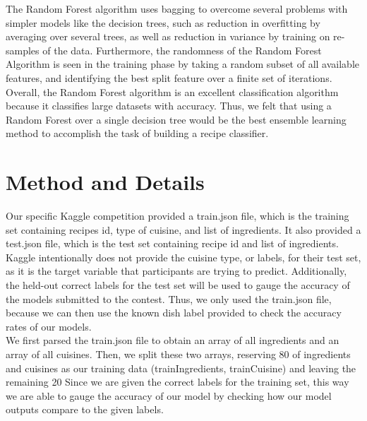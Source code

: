 \documentclass[11pt]{article}
\begin{document}
The Random Forest algorithm uses bagging to overcome several problems with simpler models
like the decision trees, such as reduction in overfitting by averaging over several trees, as well
as reduction in variance by training on re-samples of the data. Furthermore,
the randomness of the Random Forest Algorithm is seen in the training phase by taking a random subset
of all available features, and identifying the best split feature over a finite set
of iterations. Overall, the Random Forest algorithm is an excellent classification
algorithm because it classifies large datasets with accuracy.
Thus, we felt that using a Random Forest over a single decision tree would be
the best ensemble learning method to accomplish the task of building a
recipe classifier. \\

\section{Method and Details}

Our specific Kaggle competition provided a train.json file, which is the training
set containing recipes id, type of cuisine, and list of ingredients. It also
provided a test.json file, which is the test set containing recipe id and list of
ingredients. Kaggle intentionally does not provide the cuisine type, or labels, for
their test set, as it is the target variable that participants are trying to predict.
Additionally, the held-out correct labels for the test set will be used to gauge
the accuracy of the models submitted to the contest. Thus, we only used the
train.json file, because we can then use the known dish label provided to check
the accuracy rates of our models. \\

We first parsed the train.json file to obtain an array of all ingredients and an
array of all cuisines. Then, we split these two arrays, reserving 80%
of ingredients and cuisines as our training data (trainIngredients, trainCuisine) and
leaving the remaining 20%
Since we are given the correct labels for the training set, this way we are able
to gauge the accuracy of our model by checking how our model outputs
compare to the given labels. \\
\end{document}
